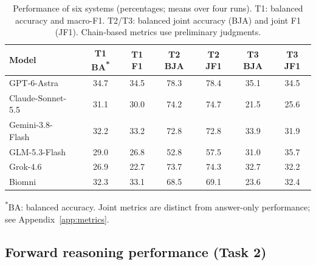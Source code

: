 \begin{table}[htbp]
    \centering
    \caption{Performance of six systems (percentages; means over four runs). T1: balanced accuracy and macro-F1. T2/T3: balanced joint accuracy (BJA) and joint F1 (JF1). Chain-based metrics use preliminary judgments.}
    \label{tab:model_performance}

    \begin{tabular*}{\linewidth}{@{\extracolsep{\fill}}lcccccc@{}}
        \toprule
        \textbf{Model}
        & \textbf{T1 BA}\textsuperscript{*}
        & \textbf{T1 F1}
        & \textbf{T2 BJA}
        & \textbf{T2 JF1}
        & \textbf{T3 BJA}
        & \textbf{T3 JF1} \\
        \midrule
        GPT-6-Astra~\cite{gpt_ref}       & 34.7 & 34.5 & 78.3 & 78.4 & 35.1 & 34.5 \\
        Claude-Sonnet-5.5~\cite{claude_ref} & 31.1 & 30.0 & 74.2 & 74.7 & 21.5 & 25.6 \\
        Gemini-3.8-Flash~\cite{gemini_ref}  & 32.2 & 33.2 & 72.8 & 72.8 & 33.9 & 31.9 \\
        GLM-5.3-Flash~\cite{glm_ref}    & 29.0 & 26.8 & 52.8 & 57.5 & 31.0 & 35.7 \\
        Grok-4.6~\cite{grok_ref}          & 26.9 & 22.7 & 73.7 & 74.3 & 32.7 & 32.2 \\
        Biomni~\cite{biomni_ref}            & 32.3 & 33.1 & 68.5 & 69.1 & 23.6 & 32.4 \\
    \bottomrule
    \end{tabular*}

    \par\smallskip
    \begin{minipage}{\linewidth}
        \small
        \raggedright
        \textsuperscript{*}BA: balanced accuracy. Joint metrics are distinct from answer-only performance; see Appendix~\ref{app:metrics}.
    \end{minipage}
\end{table}

\subsection{Forward reasoning performance (Task 2)}

